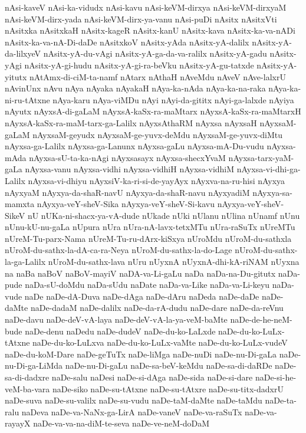 {nAsi-kaveV
nAsi-ka-vidudx
nAsi-kavu
nAsi-keVM-dirxya
nAsi-keVM-dirxyaM
nAsi-keVM-dirx-yada
nAsi-keVM-dirx-ya-vanu
nAsi-puDi
nAsitx
nAsitxVti
nAsitxka
nAsitxkaH
nAsitx-kageR
nAsitx-kanU
nAsitx-kava
nAsitx-ka-va-nADi
nAsitx-ka-va-nA-Di-daDe
nAsitxkoV
nAsitx-yAda
nAsitx-yA-dalilx
nAsitx-yA-da-lilxyeV
nAsitx-yA-du-vAgi
nAsitx-yA-ga-da-va-ralilx
nAsitx-yA-gadu
nAsitx-yAgi
nAsitx-yA-gi-hudu
nAsitx-yA-gi-ra-beVku
nAsitx-yA-gu-tatxde
nAsitx-yA-yitutx
nAtAmx-di-ciM-ta-namf
nAtarx
nAthaH
nAveMdu
nAveV
nAve-lalxrU
nAvinUnx
nAvu
nAya
nAyaka
nAyakaH
nAya-ka-nAda
nAya-ka-na-raka
nAya-ka-ni-ru-tAtxne
nAya-karu
nAya-viMDu
nAyi
nAyi-da-gititx
nAyi-ga-lalxde
nAyiya
nAyutx
nAyxsA-di-gaLaM
nAyxsA-kaSx-ra-maMtarx
nAyxsA-kaSx-ra-maMtarxH
nAyxsA-kaSx-ra-maM-tarx-ga-Lalilx
nAyxsAthaRM
nAyxsa
nAyxsaH
nAyxsaM-gaLaM
nAyxsaM-geyudx
nAyxsaM-ge-yuvx-deMdu
nAyxsaM-ge-yuvx-diMtu
nAyxsa-ga-Lalilx
nAyxsa-ga-Lanunx
nAyxsa-gaLu
nAyxsa-mA-Du-vudu
nAyxsa-mAda
nAyxsa-sU-ta-ka-nAgi
nAyxsasayx
nAyxsa-shecxYvaM
nAyxsa-tarx-yaM-gaLa
nAyxsa-vanu
nAyxsa-vidhi
nAyxsa-vidhiH
nAyxsa-vidhiM
nAyxsa-vi-dhi-ga-Lalilx
nAyxsa-vi-dhiyu
nAyxsiV-ka-ri-si-de-yayAyx
nAyxva-na-ru-hisi
nAyxya
nAyxyaM
nAyxya-da-shaR-navU
nAyxya-da-shaR-navu
nAyxyadiM
nAyxya-sa-mamxta
nAyxya-veY-sheV-Sika
nAyxya-veY-sheV-Si-kavu
nAyxya-veY-sheV-SikeV
nU
nUKa-ni-shacx-ya-vA-dude
nUkade
nUki
nUlanu
nUlina
nUnamf
nUnu
nUnu-kU-nu-gaLa
nUpura
nUra
nUra-nA-lavx-tetxMTu
nUra-raSuTx
nUreMTu
nUreM-Tu-parx-Nama
nUreM-Tu-ru-dArx-kiSxya
nUroMdu
nUroM-du-sathxla
nUroM-du-sathx-la-dA-ca-ra-Neya
nUroM-du-sathx-la-do-Lage
nUroM-du-sathx-la-ga-Lalilx
nUroM-du-sathx-lava
nUru
nUyxnA
nUyxnA-dhi-kA-riNAM
nUyxna
na
naBa
naBoV
naBoV-mayiV
naDA-va-Li-gaLu
naDa
naDa-na-Du-gitutx
naDa-pude
naDa-sU-doMdu
naDa-sUdu
naDate
naDa-va-Like
naDa-va-Li-keyu
naDa-vude
naDe
naDe-dA-Duva
naDe-dAga
naDe-dAru
naDeda
naDe-daDe
naDe-daMte
naDe-dadaM
naDe-dalilx
naDe-da-rA-dudu
naDe-dare
naDe-da-reVnu
naDe-davu
naDe-deV-vA-laya
naDe-deV-vA-la-ya-veM-baMte
naDe-de-he-neM-bude
naDe-denu
naDedu
naDe-dudeV
naDe-du-ko-LaLxde
naDe-du-ko-LuLx-tAtxne
naDe-du-ko-LuLxva
naDe-du-ko-LuLx-vaMte
naDe-du-ko-LuLx-vudeV
naDe-du-koM-Dare
naDe-geTuTx
naDe-liMga
naDe-nuDi
naDe-nu-Di-gaLa
naDe-nu-Di-ga-LiMda
naDe-nu-Di-gaLu
naDe-sa-beV-keMdu
naDe-sa-di-daRDe
naDe-sa-di-dadxre
naDe-salu
naDesi
naDe-si-dAga
naDe-sida
naDe-si-dare
naDe-si-he-veM-ba-vara
naDe-siko
naDe-su-tAtxne
naDe-su-tAtxre
naDe-su-titx-dadxrU
naDe-suva
naDe-su-valilx
naDe-su-vudu
naDe-taM-daMte
naDe-taMdu
naDe-ta-ralu
naDeva
naDe-va-NaNx-ga-LirA
naDe-vaneV
naDe-va-raSuTx
naDe-va-rayayX
naDe-va-va-na-diM-te-seva
naDe-ve-neM-doDaM
}
